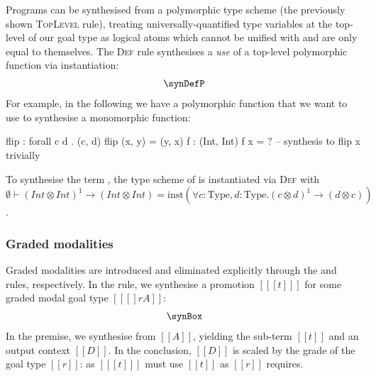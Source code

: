 Programs can be synthesised from a polymorphic type scheme (the
previously shown \textsc{TopLevel} rule), treating
universally-quantified type variables at the top-level of our goal type
as logical atoms which cannot be unified with and are only equal to
themselves. The \textsc{Def} rule synthesises a \emph{use}
of a top-level polymorphic function via instantiation:
\begin{align*}
  \synDefP
\end{align*}
%
For example, in the following we have a polymorphic
function  that we want to use to synthesise a monomorphic function:
%
\begin{granule}
flip : forall c d  . (c, d) %
flip (x, y) = (y, x)
f : (Int, Int) %
f x = ? -- synthesis to flip x trivially
\end{granule}
%
To synthesise the term , the type scheme of  is
instantiated via \textsc{Def} with
$\emptyset \vdash (\mathit{Int} \otimes \mathit{Int})^1 \rightarrow (\mathit{Int} \otimes \mathit{Int})
= \text{inst}(\forall c : \text{Type}, d : \text{Type} . (c \otimes d)^1 \rightarrow (d \otimes c))$.

\subsubsection{Graded modalities}

Graded modalities are introduced and eliminated explicitly through the
\GRANULEdruleBoxName and \GRANULEdruleUnboxName rules, respectively. In the
\GRANULEdruleBoxName{} rule, we synthesise a promotion $[[ [ t ] ]]$ for some graded
modal goal type $[[ [] r A ]]$:
\begin{align*}
  \synBox
\end{align*}
In the premise, we synthesise from $[[ A ]]$, yielding the sub-term $[[ t ]]$ and
an output context $[[ D ]]$. In the conclusion, $[[ D ]]$ is scaled by the grade
of the goal type $[[ r ]]$: as $[[ [t] ]]$ must use $[[ t ]]$ as $[[ r ]]$
requires.


